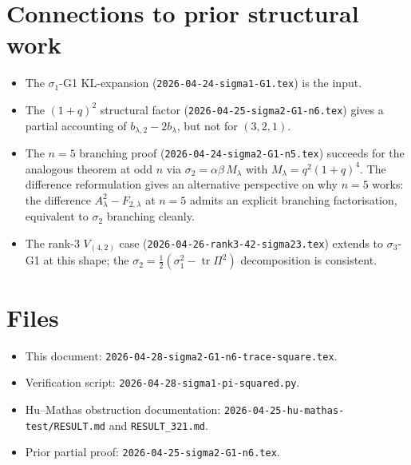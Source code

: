 \documentclass{article}
\theoremstyle{definition}
\begin{document}
\section{Connections to prior structural work}

\begin{itemize}
\item The $\sigma_1$-G1 KL-expansion (\verb|2026-04-24-sigma1-G1.tex|) is the input.
\item The $(1+q)^2$ structural factor (\verb|2026-04-25-sigma2-G1-n6.tex|) gives a partial accounting of $b_{\lambda,2}-2b_\lambda$, but not for $(3,2,1)$.
\item The $n=5$ branching proof (\verb|2026-04-24-sigma2-G1-n5.tex|) succeeds for the analogous theorem at odd $n$ via $\sigma_2 = \alpha\beta\,M_\lambda$ with $M_\lambda = q^2(1+q)^4$. The difference reformulation gives an alternative perspective on why $n=5$ works: the difference $A_\lambda^2 - F_{2,\lambda}$ at $n=5$ admits an explicit branching factorisation, equivalent to $\sigma_2$ branching cleanly.
\item The rank-3 $V_{(4,2)}$ case (\verb|2026-04-26-rank3-42-sigma23.tex|) extends to $\sigma_3$-G1 at this shape; the $\sigma_2 = \tfrac{1}{2}(\sigma_1^2-\operatorname{tr}\Pi^2)$ decomposition is consistent.
\end{itemize}

\section*{Files}

\begin{itemize}
\item This document: \verb|2026-04-28-sigma2-G1-n6-trace-square.tex|.
\item Verification script: \verb|2026-04-28-sigma1-pi-squared.py|.
\item Hu--Mathas obstruction documentation: \verb|2026-04-25-hu-mathas-test/RESULT.md| and \verb|RESULT_321.md|.
\item Prior partial proof: \verb|2026-04-25-sigma2-G1-n6.tex|.
\end{itemize}
\end{document}
